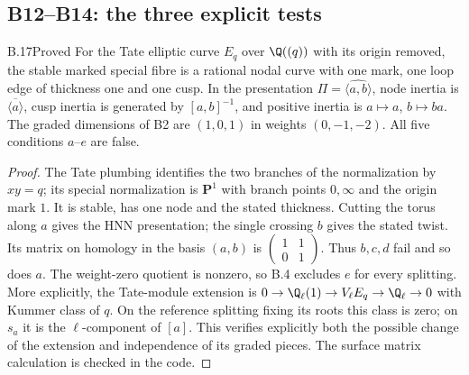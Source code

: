 

\subsection{B12--B14: the three explicit tests}

\begin{claim}{B.17}{Proved}
For the Tate elliptic curve $E_q$ over $\Q((q))$ with its origin removed,
the stable marked special fibre is a rational nodal curve with one mark,
one loop edge of thickness one and one cusp. In the presentation
$\Pi=\widehat{\langle a,b\rangle}$, node inertia is $\overline{\langle a\rangle}$,
cusp inertia is generated by $[a,b]^{-1}$, and positive inertia is
$a\mapsto a$, $b\mapsto ba$. The graded dimensions of B2 are $(1,0,1)$
in weights $(0,-1,-2)$. All five conditions $a$--$e$ are false.
\end{claim}
\begin{proof}
The Tate plumbing identifies the two branches of the normalization by
$xy=q$; its special normalization is $\mathbf P^1$ with branch points
$0,\infty$ and the origin mark $1$. It is stable, has one node and the
stated thickness. Cutting the torus along $a$ gives the HNN presentation;
the single crossing $b$ gives the stated twist. Its matrix on homology in
the basis $(a,b)$ is $\left(\begin{smallmatrix}1&1\\0&1\end{smallmatrix}\right)$.
Thus $b,c,d$ fail and so does $a$. The weight-zero quotient is nonzero, so
B.4 excludes $e$ for every splitting. More explicitly, the Tate-module
extension is $0\to\Q_\ell(1)\to V_\ell E_q\to\Q_\ell\to0$ with Kummer
class of $q$. On the reference splitting fixing its roots this class is
zero; on $s_a$ it is the $\ell$-component of $[a]$. This verifies explicitly
both the possible change of the extension and independence of its graded
pieces. The surface matrix calculation is checked in the code.
\end{proof}

